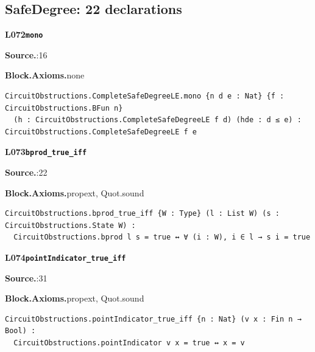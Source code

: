 \subsection*{SafeDegree: 22 declarations}
\par\medskip\noindent\begin{minipage}{\textwidth}
{\small\bfseries L072\enspace\texttt{mono}\par}
{\footnotesize\raggedright\textbf{Source.}\enspace{}:16\par
\textbf{Block.}\quad\textbf{Axioms.}\enspace none\par}\nopagebreak
\begin{lstlisting}
CircuitObstructions.CompleteSafeDegreeLE.mono {n d e : Nat} {f : CircuitObstructions.BFun n}
  (h : CircuitObstructions.CompleteSafeDegreeLE f d) (hde : d ≤ e) : CircuitObstructions.CompleteSafeDegreeLE f e
\end{lstlisting}
\end{minipage}\par

\par\medskip\noindent\begin{minipage}{\textwidth}
{\small\bfseries L073\enspace\texttt{bprod\_true\_iff}\par}
{\footnotesize\raggedright\textbf{Source.}\enspace{}:22\par
\textbf{Block.}\quad\textbf{Axioms.}\enspace propext, Quot.sound\par}\nopagebreak
\begin{lstlisting}
CircuitObstructions.bprod_true_iff {W : Type} (l : List W) (s : CircuitObstructions.State W) :
  CircuitObstructions.bprod l s = true ↔ ∀ (i : W), i ∈ l → s i = true
\end{lstlisting}
\end{minipage}\par

\par\medskip\noindent\begin{minipage}{\textwidth}
{\small\bfseries L074\enspace\texttt{pointIndicator\_true\_iff}\par}
{\footnotesize\raggedright\textbf{Source.}\enspace{}:31\par
\textbf{Block.}\quad\textbf{Axioms.}\enspace propext, Quot.sound\par}\nopagebreak
\begin{lstlisting}
CircuitObstructions.pointIndicator_true_iff {n : Nat} (v x : Fin n → Bool) :
  CircuitObstructions.pointIndicator v x = true ↔ x = v
\end{lstlisting}
\end{minipage}\par

